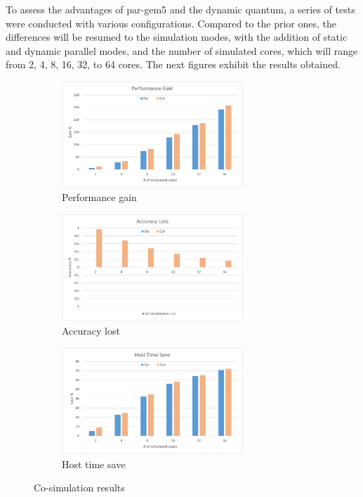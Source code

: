 To assess the advantages of par-gem5 and the dynamic quantum, a series of tests were conducted with various configurations. Compared to the prior 
ones, the differences will be resumed to the simulation modes, with the addition of static and dynamic parallel modes, and the number of simulated 
cores, which will range from 2, 4, 8, 16, 32, to 64 cores. The next figures exhibit the results obtained. 


\begin{figure}[]
	\centering
	\begin{subfigure}{\textwidth}
		\centering
		\includegraphics[width=0.75\textwidth]{Images/Performance_CO_SIM.png}
		\caption{ Performance gain}
	\end{subfigure}
	\begin{subfigure}{\textwidth}
		\centering
		\includegraphics[width=0.75\textwidth]{Images/Accuracy_CO_SIM.png}
		\caption{ Accuracy lost}
	\end{subfigure}
	\begin{subfigure}{\textwidth}
		\centering
		\includegraphics[width=0.75\textwidth]{Images/Host_CO_SIM.png}
		\caption{ Host time save}
	\end{subfigure}
			
	\caption{Co-simulation results}
\end{figure}


